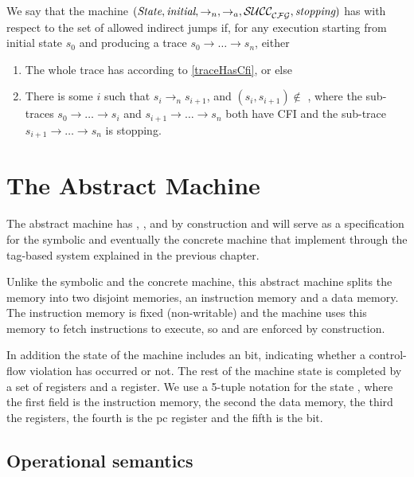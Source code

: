 \begin{definition}[CFI]\label{cfi}
  We say that the machine
  $(\textit{State}, \textit{initial}, \to_n,\allowbreak \to_a, \mathcal{SUCC_\mathcal{CFG}^{}}, \textit{stopping})$
  has \CFI with respect to the set of allowed indirect jumps \CFG
  if, for any execution starting from initial state $s_0$
  and producing a trace $s_0 \to \ldots \to s_n$, either
  \begin{enumerate}
  \item The whole trace has \CFI according to
    \cref{traceHasCfi}, or else
  \item There is some $i$ such that $s_i \to_n s_{i+1}$,
  and $(s_i, s_{i+1}) \not \in$ \SUCC{}, where
  the sub-traces $s_0 \to \ldots \to s_i$ and
  $s_{i+1} \to \ldots \to s_n$ both have CFI
  and the sub-trace $s_{i+1} \to \ldots \to s_n$ is stopping.
  \end{enumerate}
\end{definition}

\section{The Abstract Machine}\label{sec:abstract_cfi}

The abstract machine has \CFI, \NXD, and \NWC by construction and will
serve as a specification for the symbolic and eventually the concrete
machine that implement \CFI through the tag-based system explained in
the previous chapter.

Unlike the symbolic and the concrete machine, this abstract machine splits the
memory into two disjoint memories, an instruction memory and a data memory. The
instruction memory is fixed (non-writable) and the machine uses this memory to
fetch instructions to execute, so \NWC and \NXD are enforced by construction.

In addition the state of the machine includes an \ok bit, indicating
whether a control-flow violation has occurred or not. The rest of the machine
state is completed by a set of registers and a \pc register. We use a 5-tuple
notation for the state \acfistat{\imem}{\dmem}{\reg}{\pc}{\ok}, where the first
field is the instruction memory, the second the data memory, the third the
registers, the fourth is the pc register and the fifth is the \ok bit.

\subsection{Operational semantics}\label{sec:abstract_semantics}


